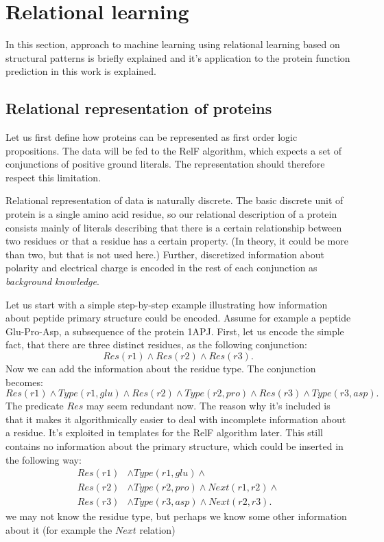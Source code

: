 \documentclass[11pt,twoside,a4paper]{book}
\begin{document}
\section{Relational learning}
In this section, approach to machine learning using relational learning based on structural patterns
is briefly explained and 
it's application to the protein function prediction in this work is explained.

\subsection{Relational representation of proteins}
Let us first define how proteins can be represented as first order logic propositions.
The data will be fed to the RelF algorithm,
which expects a set of conjunctions of positive ground literals.
The representation should therefore respect this limitation.

Relational representation of data is naturally discrete.
The basic discrete unit of protein is a single amino acid residue,
so our relational description of a protein consists mainly
of literals describing that there is a certain relationship between 
two residues or that a residue has a certain property.
(In theory, it could be more than two, but that is not used here.)
Further, discretized information about polarity and electrical charge
is encoded in the rest of each conjunction as \emph{background knowledge}.

Let us start with a simple step-by-step example illustrating how information about
peptide primary structure could be encoded.
Assume for example a peptide Glu-Pro-Asp, a subsequence of the protein 1APJ.
First, let us encode the simple fact,
that there are three distinct residues, as the following conjunction:
\[ Res(r1) \land Res(r2) \land Res(r3). \]
Now we can add the information about the residue type. The conjunction becomes:
\[ Res(r1) \land Type(r1, glu) \land Res(r2) \land Type(r2, pro) \land Res(r3) \land Type(r3, asp). \]
The predicate $Res$ may seem redundant now.
The reason why it's included is that it makes it algorithmically easier to deal with incomplete information about a residue.
It's exploited in templates for the RelF algorithm later.
This still contains no information about the primary structure, 
which could be inserted in the following way:
\begin{align*}
Res(r1)& \land Type(r1, glu) \land \\
Res(r2)& \land Type(r2, pro) \land Next(r1, r2) \land \\
Res(r3)& \land Type(r3, asp) \land Next(r2, r3). 
\end{align*}
we may not know the residue type, but perhaps we know some other information about it
(for example the $Next$ relation)
\end{document}
